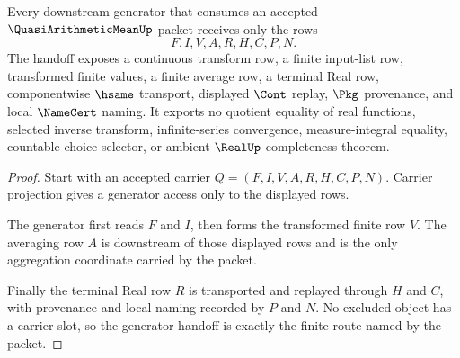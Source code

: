 \begin{theorem}
\label{thm:quasi-arithmetic-mean-generator-handoff}
Every downstream generator that consumes an accepted $\QuasiArithmeticMeanUp$ packet receives only the rows
$$
F,I,V,A,R,H,C,P,N.
$$
The handoff exposes a continuous transform row, a finite input-list row, transformed finite values, a finite average row, a terminal Real row, componentwise $\hsame$ transport, displayed $\Cont$ replay, $\Pkg$ provenance, and local $\NameCert$ naming. It exports no quotient equality of real functions, selected inverse transform, infinite-series convergence, measure-integral equality, countable-choice selector, or ambient $\RealUp$ completeness theorem.
\end{theorem}
\begin{proof}
Start with an accepted carrier $Q=(F,I,V,A,R,H,C,P,N)$. Carrier projection gives a generator access only to the displayed rows.

The generator first reads $F$ and $I$, then forms the transformed finite row $V$. The averaging row $A$ is downstream of those displayed rows and is the only aggregation coordinate carried by the packet.

Finally the terminal Real row $R$ is transported and replayed through $H$ and $C$, with provenance and local naming recorded by $P$ and $N$. No excluded object has a carrier slot, so the generator handoff is exactly the finite route named by the packet.
\end{proof}




